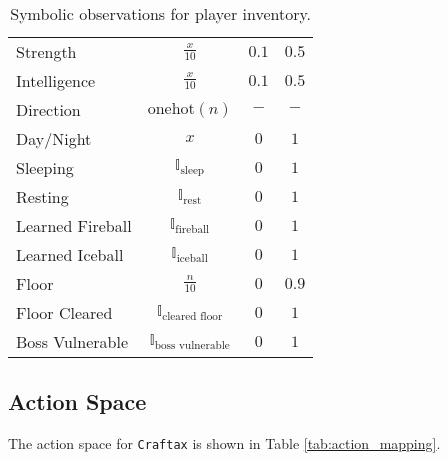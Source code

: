 \documentclass{article}
\theoremstyle{plain}
\theoremstyle{definition}
\theoremstyle{remark}
\begin{document}
\begin{table*}[t]
\begin{tabular}{@{}l c c c@{}}
    Strength & $\frac{x}{10}$ & $0.1$ & $0.5$ \\
    Intelligence & $\frac{x}{10}$ & $0.1$ & $0.5$ \\
    Direction & $\text{onehot}(n)$ & $-$ & $-$ \\
    Day/Night & $x$ & $0$ & $1$ \\
    Sleeping & $\mathbb{I}_{\text{sleep}}$ & $0$ & $1$ \\
    Resting & $\mathbb{I}_{\text{rest}}$ & $0$ & $1$ \\
    Learned Fireball & $\mathbb{I}_{\text{fireball}}$ & $0$ & $1$ \\
    Learned Iceball & $\mathbb{I}_{\text{iceball}}$ & $0$ & $1$ \\
    Floor & $\frac{n}{10}$ & $0$ & $0.9$ \\
    Floor Cleared & $\mathbb{I}_{\text{cleared floor}}$ & $0$ & $1$ \\
    Boss Vulnerable & $\mathbb{I}_{\text{boss vulnerable}}$ & $0$ & $1$ \\
    \bottomrule
\end{tabular}
\caption{Symbolic observations for player inventory.}
\label{tab:symbolic_obs_inv}
\end{table*}

\subsection{Action Space} \label{app:action_space}

The action space for \texttt{Craftax} is shown in Table \ref{tab:action_mapping}.
\end{document}
